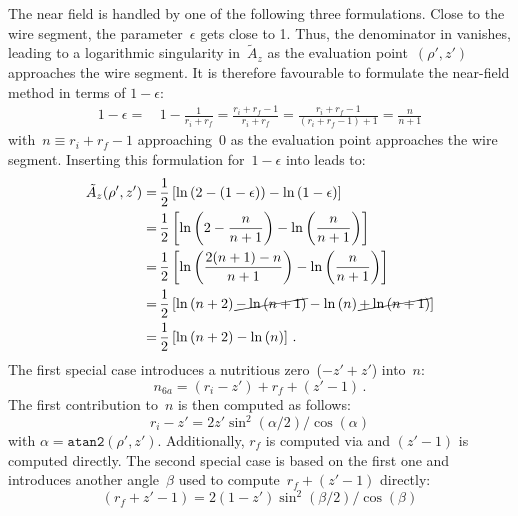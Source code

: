 The near field is handled by one of the following three formulations.
Close to the wire segment, the parameter~$\epsilon$ gets close to 1.
Thus, the denominator in  vanishes, leading to a logarithmic singularity in~$\tilde{A}_z$
as the evaluation point~$(\rho', z')$ approaches the wire segment.
It is therefore favourable to formulate the near-field method in terms of $1-\epsilon$:
\begin{align}
  1-\epsilon =&\, 1 - \frac{1}{r_i + r_f} = \frac{r_i + r_f - 1}{r_i + r_f} = \frac{r_i + r_f - 1}{(r_i + r_f - 1) + 1} = \frac{n}{n + 1}
\end{align}
with~$n \equiv r_i + r_f - 1$ approaching~$0$ as the evaluation point approaches the wire segment.
Inserting this formulation for~$1-\epsilon$ into  leads to:
\begin{align}
  \tilde{A}_z (\rho', z')
  =&\, \frac{1}{2}  \left[ \ln\left(2 - (1-\epsilon)        \right) - \ln \left(1 - \epsilon    \right) \right] \nonumber \\
  =&\, \frac{1}{2}  \left[ \ln\left(2 - \frac{n}{n + 1}     \right) - \ln \left(\frac{n}{n + 1} \right) \right] \nonumber \\
  =&\, \frac{1}{2}  \left[ \ln\left(\frac{2(n+1) - n}{n + 1}\right) - \ln \left(\frac{n}{n + 1} \right) \right] \nonumber \\
  =&\, \frac{1}{2}  \left[ \ln\left(n + 2                   \right) \cancel{- \ln\left(n + 1 \right)} - \ln \left( n \right) \cancel{+ \ln \left( n + 1 \right)} \right] \nonumber \\
  =&\, \frac{1}{2}  \left[ \ln\left(n + 2                   \right) - \ln \left( n \right) \right] \, .
\end{align}
The first special case introduces a nutritious zero~($-z' + z'$) into~$n$:
\begin{equation}
  n_{6a} = (r_i - z') + r_f + (z'-1) \, .
\end{equation}
The first contribution to~$n$ is then computed as follows:
\begin{equation}
  r_i - z' = 2 z' \sin^2(\alpha/2) / \cos(\alpha) \label{eqn:ri_zp}
\end{equation}
with $\alpha = \texttt{atan2}(\rho', z')$.
Additionally, $r_f$ is computed via  and $(z'-1)$ is computed directly.
The second special case is based on the first one and introduces another angle~$\beta$
used to compute~$r_f + (z'-1)$ directly:
\begin{equation}
  (r_f + z' - 1) = 2 (1 - z') \sin^2(\beta/2) / \cos(\beta) \label{eqn:rf_zp_1}
\end{equation}
